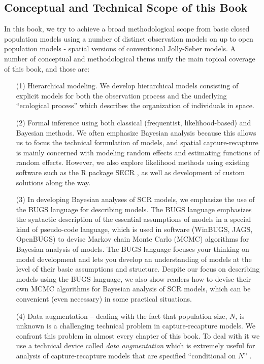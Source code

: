 \subsection{Conceptual and Technical Scope of this Book}

In this book, we try to achieve a broad methodological scope from
basic closed population models using a number of distinct observation
models on up to open population models - spatial versions of
conventional Jolly-Seber models. A number of conceptual and
methodological thems unify the main topical coverage of this book, and
those are:

\begin{itemize}
\item[(1)] Hierarchical modeling. We develop hierarchical models
  consisting of explicit models for both the observation process and
  the underlying ``ecological process'' which describes the
  organization of individuals in space.

\item[(2)] Formal inference using both classical (frequentist,
  likelihood-based) and Bayesian methods. We often emphasize
  Bayesian analysis because this allows us to focus the technical
  formulation of models, and spatial capture-recapture is mainly
  concerned with modeling random effects and estimating functions of
  random effects. However, we also explore likelihood methods using existing
  software such as the R package SECR \citep{efford:2011}, as well as
  development of custom solutions along the way.  

\item[(3)] In developing Bayesian analyses of SCR models, we emphasize
  the use of the BUGS language for describing models. The BUGS
  language emphasizes the syntactic description of the essential
  assumptions of models in a special kind of pseudo-code language,
  which is used in software (WinBUGS, JAGS, OpenBUGS) to devise Markov
  chain Monte Carlo (MCMC) algorithms for Bayesian analysis of
  models. The BUGS language focuses your thinking on model development
  and lets you develop an understanding of models at the level of
  their basic assumptions and structure.  Despite our focus on
  describing models using the BUGS language, we also show readers how
  to devise their own MCMC algorithms for Bayesian analysis of SCR
  models, which can be convenient (even necessary) in some practical
  situations.

\item[(4)] Data augmentation -- dealing with the fact that population
  size, $N$, is unknown is a challenging technical problem in
  capture-recapture models. We confront this problem in almost every
  chapter of this book. To deal with it we use a technical device
  called {\it data augmentation} which is extremely useful for
  analysis of capture-recapture models that are specified
  ``conditional on $N$'' \citep{royle_etal:2007}.
\end{itemize}

